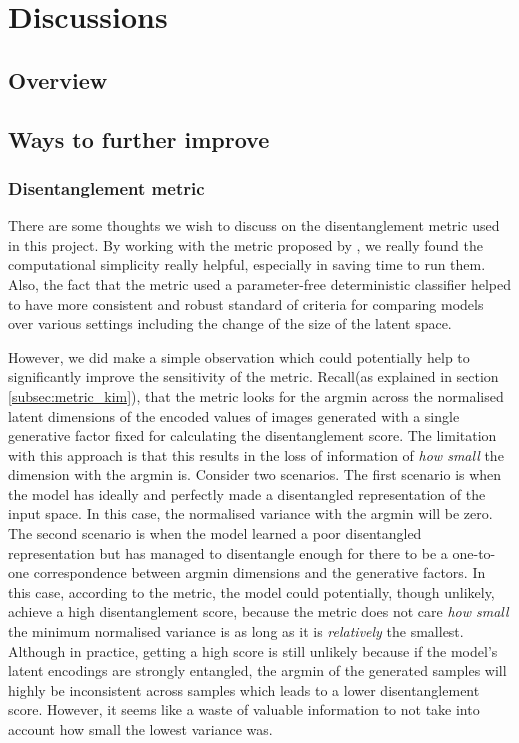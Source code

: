 \chapter{Discussions} \label{ch:discussions}

    \section{Overview}
    
    \section{Ways to further improve}
        \subsection{Disentanglement metric}
            There are some thoughts we wish to discuss on the disentanglement metric used in this project. By working with the metric proposed by \cite{kim2018disentangling}, we really found the computational simplicity really helpful, especially in saving time to run them. Also, the fact that the metric used a parameter-free deterministic classifier helped to have more consistent and robust standard of criteria for comparing models over various settings including the change of the size of the latent space.
            
            However, we did make a simple observation which could potentially help to significantly improve the sensitivity of the metric. Recall(as explained in section \ref{subsec:metric_kim}), that the metric looks for the argmin across the normalised latent dimensions of the encoded values of images generated with a single generative factor fixed for calculating the disentanglement score. The limitation with this approach is that this results in the loss of information of \textit{how small} the dimension with the argmin is. Consider two scenarios. The first scenario is when the model has ideally and perfectly made a disentangled representation of the input space. In this case, the normalised variance with the argmin will be zero. The second scenario is when the model learned a poor disentangled representation but has managed to disentangle enough for there to be a one-to-one correspondence between argmin dimensions and the generative factors. In this case, according to the metric, the model could potentially, though unlikely, achieve a high disentanglement score, because the metric does not care \textit{how small} the minimum normalised variance is as long as it is \textit{relatively} the smallest. Although in practice, getting a high score is still unlikely because if the model's latent encodings are strongly entangled, the argmin of the generated samples will highly be inconsistent across samples which leads to a lower disentanglement score. However, it seems like a waste of valuable information to not take into account how small the lowest variance was.
            

